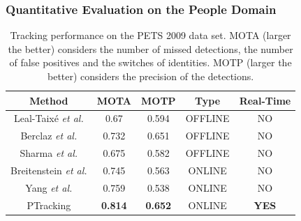 \begin{frame}
	\frametitle{Quantitative Evaluation on the People Domain}
	
	\begin{table}[!t]
		\renewcommand{\arraystretch}{1.3}
		\caption{Tracking performance on the PETS 2009 data set. MOTA (larger the better)
				 considers the number of missed detections, the number of false positives
				 and the switches of identities. MOTP (larger the better) considers the
				 precision of the detections.}
		\centering
		\vspace{0.2cm}
		
		\begin{tabular}{ccccc}
			\hline
			\hline
			\textbf{Method} & \textbf{MOTA} & \textbf{MOTP} & \textbf{Type} & \textbf{Real-Time} \\
			\hline
			Leal-Taix\'{e} \emph{et al.} & 0.67 & 0.594 & OFFLINE & NO \\
			\hline
			Berclaz \emph{et al.} & 0.732 & 0.651 & OFFLINE & NO \\
			\hline
			Sharma \emph{et al.} & 0.675 & 0.582 & OFFLINE & NO \\
			\hline
			Breitenstein \emph{et al.} & 0.745 & 0.563 & ONLINE & NO \\
			\hline
			Yang \emph{et al.} & 0.759 & 0.538 & ONLINE & NO \\
			\hline
			PTracking & \textbf{0.814} & \textbf{0.652} & ONLINE & \textbf{YES} \\
			\hline
		\hline
		\end{tabular}
	\end{table}
\end{frame}

